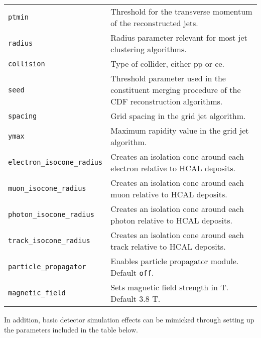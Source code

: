 \documentclass[a4paper]{article}
\begin{document}
\begin{center}
\begin{tabular}{l p{9.4cm}}
\color{ao} \verb?ptmin? & Threshold for the transverse momentum of the
  reconstructed jets.\\
\color{ao} \verb?radius? & Radius parameter relevant for most jet
clustering algorithms.\\
\color{ao} \verb?collision? & Type of collider, either pp or ee.\\
\color{ao} \verb?seed? & Threshold parameter used in the constituent merging
  procedure of the CDF reconstruction algorithms.\\
\color{ao} \verb?spacing? & Grid spacing in the grid jet algorithm.\\
\color{ao} \verb?ymax? & Maximum rapidity value in the grid jet algorithm.\\

\color{ao} \verb?electron_isocone_radius? & Creates an isolation cone around each electron relative to HCAL deposits.\\
\color{ao} \verb?muon_isocone_radius? & Creates an isolation cone around each muon relative to HCAL deposits.\\
\color{ao} \verb?photon_isocone_radius? & Creates an isolation cone around each photon relative to HCAL deposits.\\
\color{ao} \verb?track_isocone_radius? & Creates an isolation cone around each track relative to HCAL deposits.\\

\color{ao} \verb?particle_propagator? & Enables particle propagator module. Default \verb?off?.\\
\color{ao} \verb?magnetic_field? & Sets magnetic field strength in T. Default 3.8 T.\\

\hline
\end{tabular}
\end{center}
\vspace{0.1cm}
\noindent In addition, basic detector simulation effects can be mimicked through setting
up the parameters included in the table below.
\renewcommand{\arraystretch}{1.2}%
\end{document}
